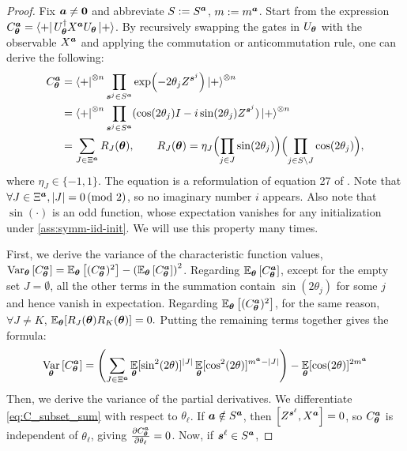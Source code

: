 \documentclass[10pt, twocolumn, a4paper]{article}
\theoremstyle{plain}
\theoremstyle{definition}
\theoremstyle{remark}
\begin{document}
\begin{proof}
Fix ${\bm{a}}\neq \mathbf 0$ and abbreviate $S:=S^{\bm{a}}$, $m:=m^{\bm{a}}$. Start from the expression $C^{\bm{a}}_{\bm{\theta}}=\bra{+} U_{\bm{\theta}}^\dagger X^{{\bm{a}}}U_{\bm{\theta}}\ket{+}
$. By recursively swapping the gates in $U_{\bm{\theta}}$ with the observable $X^{{\bm{a}}}$ and applying the commutation or anticommutation rule, one can derive the following:
\begin{align}
C^{\bm{a}}_{\bm{\theta}}
&= \bra{+}^{\otimes n} \prod_{{\bm{s}^j}\in S^{\bm{a}}} \exp(-2\theta_jZ^{\bm{s}^j}) \ket{+}^{\otimes n} \\
&= \bra{+}^{\otimes n} \prod_{{\bm{s}^j}\in S^{\bm{a}}} (\cos(2\theta_j)I - i \sin(2\theta_j)Z^{\bm{s}^j}) \ket{+}^{\otimes n}  \\
&= \sum_{J\in\Xi^{\bm{a}}} R_J({\bm{\theta}}), \qquad R_J({\bm{\theta}})=\eta_J 
\Bigl(\prod_{j\in J} \sin(2\theta_j)\Bigr)\Bigl(\prod_{j\in S\setminus J}\cos(2\theta_j)\Bigr),
\label{eq:C_subset_sum}
\end{align}
where $\eta_J \in \{-1,1\}$. The equation is a reformulation of equation 27 of \cite{recioarmengol25}. Note that $\forall J \in \Xi^{\bm{a}}, \abs{J} = 0 \, (\text{mod 2})$, so no imaginary number $i$ appears. Also note that $\sin(\cdot)$ is an odd function, whose expectation vanishes for any initialization under \cref{ass:symm-iid-init}. We will use this property many times.

First, we derive the variance of the characteristic function values, $\operatorname*{Var}_{\bm{\theta}} \left[ C^{\bm{a}}_{\bm{\theta}} \right] = \operatorname*{\mathbb{E}}_{\bm{\theta}} \left[ (C^{\bm{a}}_{\bm{\theta}})^2\right] - \left(\operatorname*{\mathbb{E}}_{\bm{\theta}} \left[ C^{\bm{a}}_{\bm{\theta}} \right]\right)^2$. Regarding $\operatorname*{\mathbb{E}}_{\bm{\theta}} \left[ C^{\bm{a}}_{\bm{\theta}} \right]$, except for the empty set $J = \emptyset$, all the other terms in the summation contain $\sin(2\theta_j)$ for some $j$ and hence vanish in expectation. Regarding $\operatorname*{\mathbb{E}}_{\bm{\theta}} \left[ (C^{\bm{a}}_{\bm{\theta}})^2\right]$, for the same reason, $\forall J \neq K$,  $\operatorname*{\mathbb{E}}_{{\bm{\theta}}}[R_J({\bm{\theta}})R_K({\bm{\theta}})] = 0.$ Putting the remaining terms together gives the formula:
\begin{equation}
\label{eq: symmetric cost variance}
     \operatorname*{Var}_{\bm{\theta}} \left[ C^{\bm{a}}_{\bm{\theta}} \right] = \left(\sum_{J \in \Xi^{\bm{a}}} \operatorname*{\mathbb{E}}_{{\bm{\theta}}}[\sin^2(2\theta)]^\abs{J} \operatorname*{\mathbb{E}}_{{\bm{\theta}}}[\cos^2(2\theta)]^{m^{\bm{a}}-\abs{J}}\right) - \operatorname*{\mathbb{E}}_{{\bm{\theta}}}[\cos(2\theta)]^{2m^{\bm{a}}}
\end{equation}
Then, we derive the variance of the partial derivatives. We differentiate \cref{eq:C_subset_sum} with respect to $\theta_\ell$. If ${\bm{a}} \notin S^{\bm{a}}$, then $\comm{Z^{\vts^\ell}}{X^\vta}=0$, so $C^{\bm{a}}_{\bm{\theta}}$ is independent of $\theta_\ell$, giving $\frac{\partial C^{\bm{a}}_{\bm{\theta}}}{\partial \theta_\ell}=0$. Now, if ${\bm{s}^\ell} \in S^{\bm{a}}$,


\end{proof}
\end{document}
